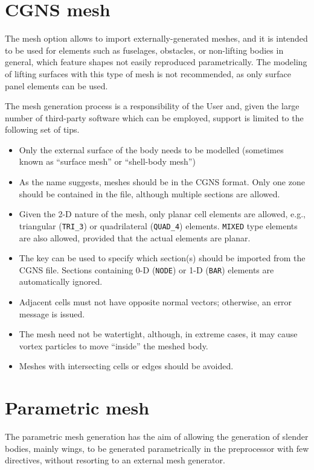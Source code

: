 \section{CGNS mesh}
The  mesh option allows to import externally-generated meshes, and it is intended to be used for elements such as fuselages, obstacles, or non-lifting bodies in general, which feature shapes not easily reproduced parametrically. The modeling of lifting surfaces with this type of mesh is not recommended, as only surface panel elements can be used.

The mesh generation process is a responsibility of the User and, given the large number of third-party software which can be employed, support is limited to the following set of tips.

\begin{itemize}
  \item Only the external surface of the body needs to be modelled (sometimes known as ``surface mesh'' or ``shell-body mesh'')
  \item As the name suggests, meshes should be in the CGNS format. Only one zone should be contained in the file, although multiple sections are allowed.
  \item Given the 2-D nature of the mesh, only planar cell elements are allowed, e.g., triangular (\texttt{TRI\_3}) or quadrilateral (\texttt{QUAD\_4}) elements. \texttt{MIXED} type elements are also allowed, provided that the actual elements are planar.
  \item The  key can be used to specify which section(s) should be imported from the CGNS file. Sections containing 0-D (\texttt{NODE}) or 1-D (\texttt{BAR}) elements are automatically ignored. 
  \item Adjacent cells must not have opposite normal vectors; otherwise, an error message is issued.
  \item The mesh need not be watertight, although, in extreme cases, it may cause vortex particles to move ``inside'' the meshed body. 
  \item Meshes with intersecting cells or edges should be avoided.
\end{itemize}


\section{Parametric mesh}
\label{sec:Parametric_mesh}

The parametric mesh generation has the aim of allowing the generation of slender bodies, mainly wings, 
to be generated parametrically in the preprocessor with few directives, without resorting to an external mesh generator. 

